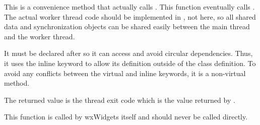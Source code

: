 
This is a convenience method that actually calls
.  This function
eventually calls .
The actual worker thread code should be implemented in
, not here, so all
shared data and synchronization objects can be shared easily between the
main thread and the worker thread.

It must be declared after  so it
can access  and avoid
circular dependencies.  Thus, it uses the inline keyword to allow its
definition outside of the class definition.  To avoid any conflicts
between the virtual and inline keywords, it is a non-virtual method.

The returned value is the thread exit code which is the value returned by
.

This function is called by wxWidgets itself and should never be called
directly.

